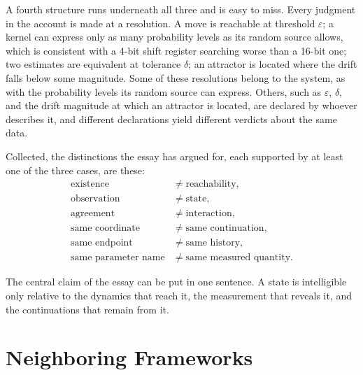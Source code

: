 \documentclass[11pt]{article}
\theoremstyle{definition}
\theoremstyle{remark}
\begin{document}
A fourth structure runs underneath all three and is easy to miss. Every judgment in the account is made at a resolution. A move is reachable at threshold $\varepsilon$; a kernel can express only as many probability levels as its random source allows, which is consistent with a 4-bit shift register searching worse than a 16-bit one; two estimates are equivalent at tolerance $\delta$; an attractor is located where the drift falls below some magnitude. Some of these resolutions belong to the system, as with the probability levels its random source can express. Others, such as $\varepsilon$, $\delta$, and the drift magnitude at which an attractor is located, are declared by whoever describes it, and different declarations yield different verdicts about the same data.

Collected, the distinctions the essay has argued for, each supported by at least one of the three cases, are these:
\begin{equation}
\begin{aligned}
\text{existence} &\neq \text{reachability},\\
\text{observation} &\neq \text{state},\\
\text{agreement} &\neq \text{interaction},\\
\text{same coordinate} &\neq \text{same continuation},\\
\text{same endpoint} &\neq \text{same history},\\
\text{same parameter name} &\neq \text{same measured quantity}.
\end{aligned}
\end{equation}

The central claim of the essay can be put in one sentence. A state is intelligible only relative to the dynamics that reach it, the measurement that reveals it, and the continuations that remain from it.

\section{Neighboring Frameworks}
\end{document}
